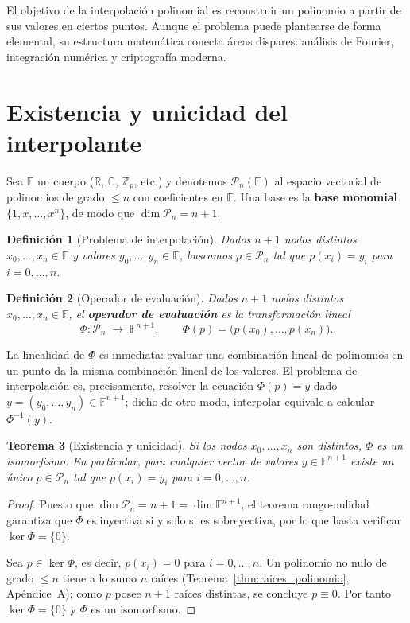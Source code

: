 \documentclass[a4paper,11pt]{report}
\newtheorem{theorem}{Teorema}[chapter]
\newtheorem{definition}[theorem]{Definición}
\begin{document}
El objetivo de la interpolación polinomial es reconstruir un polinomio a partir de sus valores en ciertos puntos.  Aunque el problema puede plantearse de forma elemental, su estructura matemática conecta áreas dispares: análisis de Fourier, integración numérica y criptografía moderna.

\section{Existencia y unicidad del interpolante}\label{sec:existencia_unicidad_interpolante}

Sea $\mathbb{F}$ un cuerpo ($\mathbb{R}$, $\mathbb{C}$, $\mathbb{Z}_p$, etc.) y denotemos $\mathcal{P}_n(\mathbb{F})$ al espacio vectorial de polinomios de grado $\leq n$ con coeficientes en $\mathbb{F}$.  Una base es la \textbf{base monomial} $\{1,x,\ldots,x^n\}$, de modo que $\dim\mathcal{P}_n = n+1$.

\begin{definition}[Problema de interpolación]
Dados $n+1$ nodos distintos $x_0,\ldots,x_n\in\mathbb{F}$ y valores $y_0,\ldots,y_n\in\mathbb{F}$, buscamos $p\in\mathcal{P}_n$ tal que $p(x_i)=y_i$ para $i=0,\ldots,n$.
\end{definition}

\begin{definition}[Operador de evaluación]
Dados $n+1$ nodos distintos $x_0,\ldots,x_n\in\mathbb{F}$, el \textbf{operador de evaluación} es la transformación lineal
\[
\Phi\colon\mathcal{P}_n \;\longrightarrow\; \mathbb{F}^{n+1},\qquad \Phi(p) = \bigl(p(x_0),\ldots,p(x_n)\bigr).
\]
\end{definition}

La linealidad de $\Phi$ es inmediata: evaluar una combinación lineal de polinomios en un punto da la misma combinación lineal de los valores.  El problema de interpolación es, precisamente, resolver la ecuación $\Phi(p) = y$ dado $y=(y_0,\ldots,y_n)\in\mathbb{F}^{n+1}$; dicho de otro modo, interpolar equivale a calcular $\Phi^{-1}(y)$.

\begin{theorem}[Existencia y unicidad]\label{thm:existencia_unicidad}
Si los nodos $x_0,\ldots,x_n$ son distintos, $\Phi$ es un isomorfismo.  En particular, para cualquier vector de valores $y\in\mathbb{F}^{n+1}$ existe un único $p\in\mathcal{P}_n$ tal que $p(x_i)=y_i$ para $i=0,\ldots,n$.
\end{theorem}
\begin{proof}
Puesto que $\dim\mathcal{P}_n = n+1 = \dim\mathbb{F}^{n+1}$, el teorema rango-nulidad garantiza que $\Phi$ es inyectiva si y solo si es sobreyectiva, por lo que basta verificar $\ker\Phi = \{0\}$.

Sea $p\in\ker\Phi$, es decir, $p(x_i)=0$ para $i=0,\ldots,n$.  Un polinomio no nulo de grado $\leq n$ tiene a lo sumo $n$ raíces (Teorema~\ref{thm:raices_polinomio}, Apéndice~A); como $p$ posee $n+1$ raíces distintas, se concluye $p\equiv 0$.  Por tanto $\ker\Phi=\{0\}$ y $\Phi$ es un isomorfismo.
\end{proof}
\end{document}
